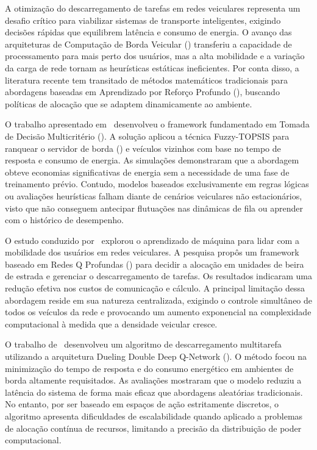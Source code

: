 A otimização do descarregamento de tarefas em redes veiculares representa um desafio crítico para viabilizar sistemas de transporte inteligentes, exigindo decisões rápidas que equilibrem latência e consumo de energia. O avanço das arquiteturas de Computação de Borda Veicular () transferiu a capacidade de processamento para mais perto dos usuários, mas a alta mobilidade e a variação da carga de rede tornam as heurísticas estáticas ineficientes. Por conta disso, a literatura recente tem transitado de métodos matemáticos tradicionais para abordagens baseadas em Aprendizado por Reforço Profundo (), buscando políticas de alocação que se adaptem dinamicamente ao ambiente.

O trabalho apresentado em~\cite{vieira2025foff} desenvolveu o framework  fundamentado em Tomada de Decisão Multicritério (). A solução aplicou a técnica Fuzzy-TOPSIS para ranquear o servidor de borda () e veículos vizinhos com base no tempo de resposta e consumo de energia. As simulações demonstraram que a abordagem obteve economias significativas de energia sem a necessidade de uma fase de treinamento prévio. Contudo, modelos baseados exclusivamente em regras lógicas ou avaliações heurísticas falham diante de cenários veiculares não estacionários, visto que não conseguem antecipar flutuações nas dinâmicas de fila ou aprender com o histórico de desempenho.

O estudo conduzido por~\cite{tan2018} explorou o aprendizado de máquina para lidar com a mobilidade dos usuários em redes veiculares. A pesquisa propôs um framework baseado em Redes Q Profundas () para decidir a alocação em unidades de beira de estrada e gerenciar o descarregamento de tarefas. Os resultados indicaram uma redução efetiva nos custos de comunicação e cálculo. A principal limitação dessa abordagem reside em sua natureza centralizada, exigindo o controle simultâneo de todos os veículos da rede e provocando um aumento exponencial na complexidade computacional à medida que a densidade veicular cresce.

O trabalho de~\cite{pang2024} desenvolveu um algoritmo de descarregamento multitarefa utilizando a arquitetura Dueling Double Deep Q-Network (). O método focou na minimização do tempo de resposta e do consumo energético em ambientes de borda altamente requisitados. As avaliações mostraram que o modelo reduziu a latência do sistema de forma mais eficaz que abordagens aleatórias tradicionais. No entanto, por ser baseado em espaços de ação estritamente discretos, o algoritmo apresenta dificuldades de escalabilidade quando aplicado a problemas de alocação contínua de recursos, limitando a precisão da distribuição de poder computacional.

